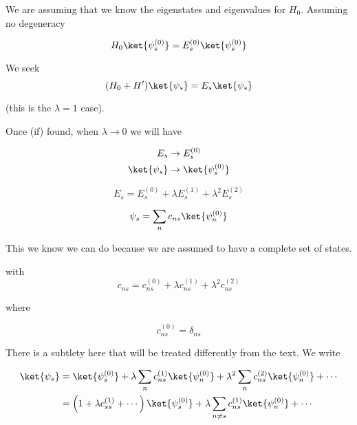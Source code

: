 We are assuming that we know the eigenstates and eigenvalues for $H_0$.  Assuming no degeneracy

\begin{equation}\label{eqn:qmTwoL3:410}
H_0 \ket{\psi_s^{(0)}} = 
E_s^{(0)}
\ket{\psi_s^{(0)}} 
\end{equation}

We seek
\begin{equation}\label{eqn:qmTwoL3:430}
(H_0 + H')\ket{\psi_s} = 
E_s
\ket{\psi_s} 
\end{equation}

(this is the $\lambda = 1$ case).

Once (if) found, when $\lambda \rightarrow 0$ we will have

\begin{align*}
E_s &\rightarrow E_s^{(0)} \\
\ket{\psi_s} &\rightarrow \ket{\psi_s^{(0)}}
\end{align*}

\begin{equation}\label{eqn:qmTwoL3:450}
E_s = E_s^{(0)}  + \lambda E_s^{(1)} + \lambda^2 E_s^{(2)}
\end{equation}

\begin{equation}\label{eqn:qmTwoL3:470}
\psi_s = \sum_n c_{ns} \ket{\psi_n^{(0)}}
\end{equation}

This we know we can do because we are assumed to have a complete set of states.

with
\begin{equation}\label{eqn:qmTwoL3:490}
c_{ns} = c_{ns}^{(0)}  + \lambda c_{ns}^{(1)} + \lambda^2 c_{ns}^{(2)}
\end{equation}

where

\begin{equation}\label{eqn:qmTwoL3:510}
c_{ns}^{(0)} = \delta_{ns}
\end{equation}

There is a subtlety here that will be treated differently from the text.  We write

\begin{align*}
\ket{\psi_s}
&=
\ket{\psi_s^{(0)}}
+ 
\lambda 
\sum_n
c_{ns}^{(1)} 
\ket{\psi_n^{(0)}}
+ 
\lambda^2
\sum_n
c_{ns}^{(2)}
\ket{\psi_n^{(0)}}
+ \cdots \\
&=
\left(
1 + \lambda c_{ss}^{(1)} + \cdots
\right)
\ket{\psi_s^{(0)}}
+ \lambda 
\sum_{n \ne s} c_{ns}^{(1)} 
\ket{\psi_n^{(0)}}
+ \cdots
\end{align*}

